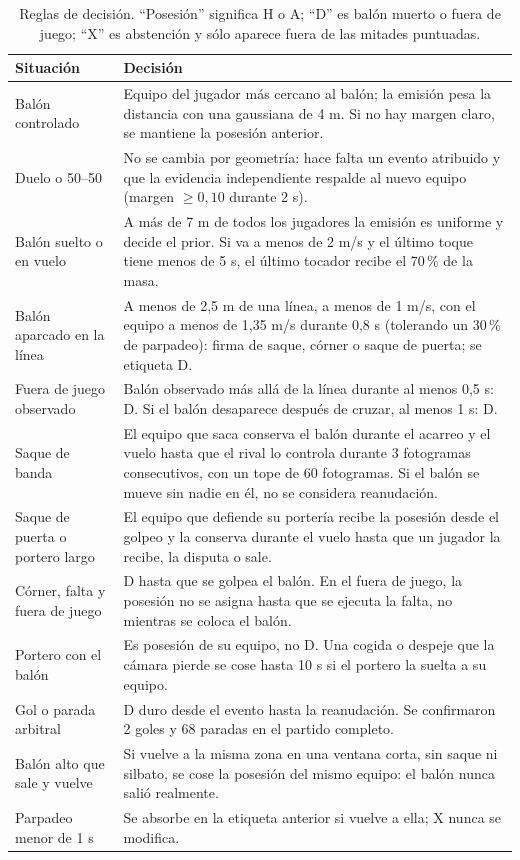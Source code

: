 \documentclass[10pt,a4paper]{article}
\begin{document}
\begin{table}[t]
\centering
\footnotesize
\caption{Reglas de decisión. ``Posesión'' significa H o A; ``D'' es balón muerto o fuera de
juego; ``X'' es abstención y sólo aparece fuera de las mitades puntuadas.}
\label{tab:rules}
\begin{tabularx}{\textwidth}{@{}>{\raggedright\arraybackslash}p{4.1cm}X@{}}
\toprule
Situación & Decisión \\
\midrule
Balón controlado & Equipo del jugador más cercano al balón; la emisión pesa la distancia con una
gaussiana de 4 m. Si no hay margen claro, se mantiene la posesión anterior. \\
Duelo o 50--50 & No se cambia por geometría: hace falta un evento atribuido y que la evidencia
independiente respalde al nuevo equipo (margen $\geq 0{,}10$ durante 2 s). \\
Balón suelto o en vuelo & A más de 7 m de todos los jugadores la emisión es uniforme y decide el
prior. Si va a menos de 2 m/s y el último toque tiene menos de 5 s, el último tocador recibe el
70\,\% de la masa. \\
Balón aparcado en la línea & A menos de 2,5 m de una línea, a menos de 1 m/s, con el equipo a
menos de 1,35 m/s durante 0,8 s (tolerando un 30\,\% de parpadeo): firma de saque, córner o saque
de puerta; se etiqueta D. \\
Fuera de juego observado & Balón observado más allá de la línea durante al menos 0,5 s: D. Si el
balón desaparece después de cruzar, al menos 1 s: D. \\
Saque de banda & El equipo que saca conserva el balón durante el acarreo y el vuelo hasta que el
rival lo controla durante 3 fotogramas consecutivos, con un tope de 60 fotogramas. Si el balón se
mueve sin nadie en él, no se considera reanudación. \\
Saque de puerta o portero largo & El equipo que defiende su portería recibe la posesión desde el
golpeo y la conserva durante el vuelo hasta que un jugador la recibe, la disputa o sale. \\
Córner, falta y fuera de juego & D hasta que se golpea el balón. En el fuera de juego, la
posesión no se asigna hasta que se ejecuta la falta, no mientras se coloca el balón. \\
Portero con el balón & Es posesión de su equipo, no D. Una cogida o despeje que la cámara pierde
se cose hasta 10 s si el portero la suelta a su equipo. \\
Gol o parada arbitral & D duro desde el evento hasta la reanudación. Se confirmaron 2 goles y 68
paradas en el partido completo. \\
Balón alto que sale y vuelve & Si vuelve a la misma zona en una ventana corta, sin saque ni
silbato, se cose la posesión del mismo equipo: el balón nunca salió realmente. \\
Parpadeo menor de 1 s & Se absorbe en la etiqueta anterior si vuelve a ella; X nunca se modifica.
\\
\bottomrule
\end{tabularx}
\end{table}
\end{document}
